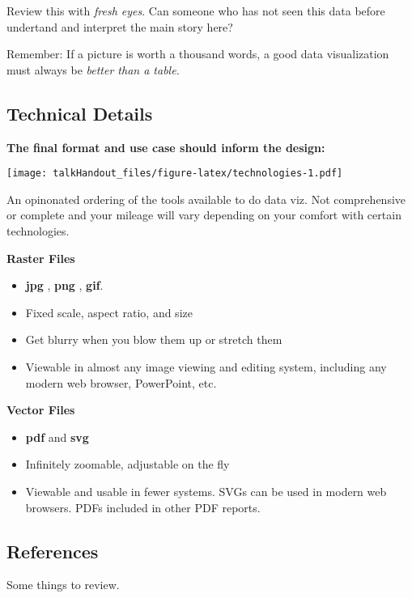 \documentclass{tufte-handout}
\begin{document}
Review this with \emph{fresh eyes}. Can someone who has not seen this
data before undertand and interpret the main story here?

Remember: If a picture is worth a thousand words, a good data
visualization must always be \emph{better than a table.}

\subsection{Technical Details}\label{technical-details}

\textbf{The final format and use case should inform the design:}

\begin{marginfigure}
 \texttt{[image: talkHandout\_files/figure-latex/technologies-1.pdf]}
\caption{An opinonated ordering of the tools available to do data viz. Not comprehensive or complete and your mileage will vary depending on your comfort with certain technologies.}
\end{marginfigure}

\textbf{Raster Files}

\begin{itemize}
\itemsep1pt\parskip0pt
\item
  \textbf{jpg} , \textbf{png} , \textbf{gif}.
\item
  Fixed scale, aspect ratio, and size
\item
  Get blurry when you blow them up or stretch them
\item
  Viewable in almost any image viewing and editing system, including any
  modern web browser, PowerPoint, etc.
\end{itemize}

\textbf{Vector Files}

\begin{itemize}
\itemsep1pt\parskip0pt
\item
  \textbf{pdf} and \textbf{svg}
\item
  Infinitely zoomable, adjustable on the fly
\item
  Viewable and usable in fewer systems. SVGs can be used in modern web
  browsers. PDFs included in other PDF reports.
\end{itemize}

\subsection{References}\label{references}

Some things to review.
\end{document}
